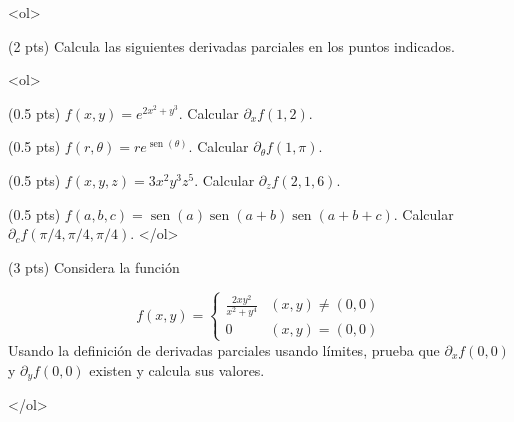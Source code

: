 \documentclass[12pt]{article}
\newcommand{\sen}{\operatorname{sen}}
\begin{document}
\bigskip

            
\bigskip
\bigskip
\bigskip


<ol>

\item (2 pts) Calcula las siguientes derivadas parciales
  en los puntos indicados.

  <ol>
  \item(0.5 pts) $f(x,y)=e^{2x^2+y^3}$. Calcular $\partial_xf(1,2)$.
  \item (0.5 pts) $f(r,\theta)=re^{\sen(\theta)}$.
      Calcular $\partial_\theta f(1,\pi)$.
    \item (0.5 pts) $f(x,y,z)=3x^{2}y^{3}z^{5}$. Calcular $\partial_zf(2,1,6)$.
    \item (0.5 pts) $f(a,b,c)=\sen(a)\sen(a+b)\sen(a+b+c)$.
      Calcular $\partial_cf(\pi/4,\pi/4, \pi/4)$.
    </ol>
    
    
  
\vspace{4cm}  
  
\item (3 pts) Considera la función

  \begin{equation*}
    f(x,y)=\left\{
      \begin{array}{cc}
        \frac{2xy^2}{x^2+y^4} & (x,y)\ne(0,0)\\
        0 & (x,y)=(0,0)
      \end{array}
    \right.
    \end{equation*}
    Usando la definición de derivadas parciales usando límites,
    prueba que $\partial_xf(0,0)$ y $\partial_yf(0,0)$ existen
    y calcula sus valores.



  </ol>


  
\end{document}

